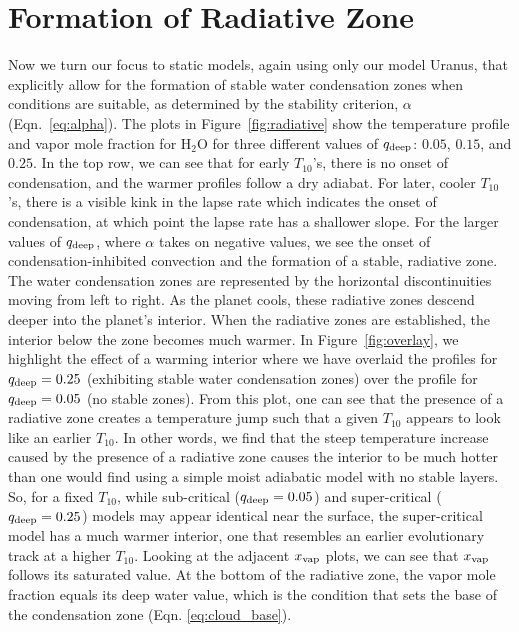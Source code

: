\documentclass[11pt]{ucscthesisbs}
\begin{document}
\section{Formation of Radiative Zone}
Now we turn our focus to static models, again using only our model Uranus, that explicitly allow for the formation of stable water condensation zones when conditions are suitable, as determined by the stability criterion, $\alpha$ (Eqn.~\ref{eq:alpha}). The plots in Figure~\ref{fig:radiative} show the temperature profile and vapor mole fraction for H$_{2}$O for three different values of $q_{\rm deep}$: $0.05$, $0.15$, and $0.25$. In the top row, we can see that for early $T_{10}$'s, there is no onset of condensation, and the warmer profiles follow a dry adiabat. For later, cooler $T_{10}$'s, there is a visible kink in the lapse rate which indicates the onset of condensation, at which point the lapse rate has a shallower slope. For the larger values of $q_{\rm deep}$, where $\alpha$ takes on negative values, we see the onset of condensation-inhibited convection and the formation of a stable, radiative zone. The water condensation zones ar{}e represented by the horizontal discontinuities moving from left to right. As the planet cools, these radiative zones descend deeper into the planet's interior. When the radiative zones are established, the interior below the zone becomes much warmer. In Figure~\ref{fig:overlay}, we highlight the effect of a warming interior where we have overlaid the profiles for $q_{\rm deep} = 0.25$ (exhibiting stable water condensation zones) over the profile for $q_{\rm deep}=0.05$ (no stable zones). From this plot, one can see that the presence of a radiative zone creates a temperature jump such that a given $T_{10}$ appears to look like an earlier $T_{10}$. In other words, we find that the steep temperature increase caused by the presence of a radiative zone causes the interior to be much hotter than one would find using a simple moist adiabatic model with no stable layers. So, for a fixed $T_{10}$, while sub-critical ($q_{\rm deep} = 0.05$) and super-critical ($q_{\rm deep} = 0.25$) models may appear identical near the surface, the super-critical model has a much warmer interior, one that resembles an earlier evolutionary track at a higher $T_{10}$. Looking at the adjacent $x_{\rm vap}$ plots, we can see that $x_{\rm vap}$ follows its saturated value. At the bottom of the radiative zone, the vapor mole fraction equals its deep water value, which is the condition that sets the base of the condensation zone (Eqn. \ref{eq:cloud_base}). 
\end{document}
